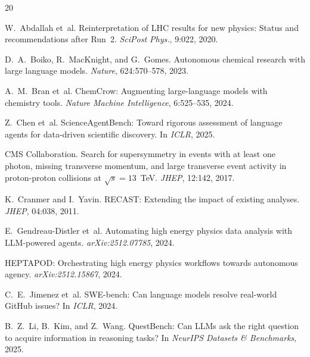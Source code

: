 \documentclass{article}
\begin{document}
\begin{thebibliography}{20}

W.~Abdallah et~al.
\newblock Reinterpretation of LHC results for new physics: Status and recommendations after Run~2.
\newblock \emph{SciPost Phys.}, 9:022, 2020.

D.~A.~Boiko, R.~MacKnight, and G.~Gomes.
\newblock Autonomous chemical research with large language models.
\newblock \emph{Nature}, 624:570--578, 2023.

A.~M.~Bran et~al.
\newblock ChemCrow: Augmenting large-language models with chemistry tools.
\newblock \emph{Nature Machine Intelligence}, 6:525--535, 2024.

Z.~Chen et~al.
\newblock ScienceAgentBench: Toward rigorous assessment of language agents for data-driven scientific discovery.
\newblock In \emph{ICLR}, 2025.

CMS Collaboration.
\newblock Search for supersymmetry in events with at least one photon, missing transverse momentum, and large transverse event activity in proton-proton collisions at $\sqrt{s}=13$~TeV.
\newblock \emph{JHEP}, 12:142, 2017.

K.~Cranmer and I.~Yavin.
\newblock RECAST: Extending the impact of existing analyses.
\newblock \emph{JHEP}, 04:038, 2011.

E.~Gendreau-Distler et~al.
\newblock Automating high energy physics data analysis with LLM-powered agents.
\newblock \emph{arXiv:2512.07785}, 2024.

HEPTAPOD: Orchestrating high energy physics workflows towards autonomous agency.
\newblock \emph{arXiv:2512.15867}, 2024.

C.~E.~Jimenez et~al.
\newblock SWE-bench: Can language models resolve real-world GitHub issues?
\newblock In \emph{ICLR}, 2024.

B.~Z.~Li, B.~Kim, and Z.~Wang.
\newblock QuestBench: Can LLMs ask the right question to acquire information in reasoning tasks?
\newblock In \emph{NeurIPS Datasets \& Benchmarks}, 2025.


\end{thebibliography}
\end{document}

